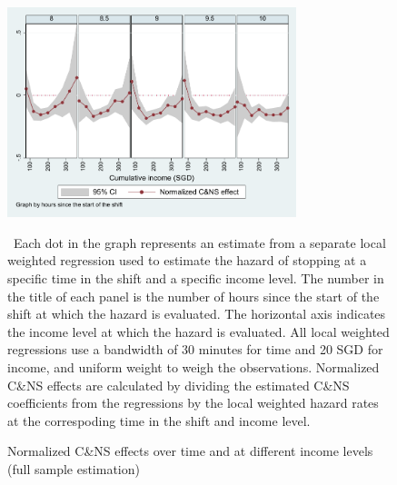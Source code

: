 \documentclass[reviewmode,AEJ]{AEA}
\begin{document}
\begin{figure}[htb]
	{\centering
		\caption{Normalized C\&NS effects over time and at different income levels (full sample estimation)} %
		\includegraphics[width=0.75\textwidth]{./fg/cnsmfxulwr80to100normalized.pdf}
		\label{fg:2dulwr}
	}
	\begin{figurenotes}
	\small\ Each dot in the graph represents an estimate from a separate local weighted regression used to estimate the hazard of stopping at a specific time in the shift and a specific income level. The number in the title of each panel is the number of hours since the start of the shift at which the hazard is evaluated. The horizontal axis indicates the income level at which the hazard is evaluated. All local weighted regressions use a bandwidth of 30 minutes for time and 20 SGD for income, and uniform weight to weigh the observations. Normalized C\&NS effects are calculated by dividing the estimated C\&NS coefficients from the regressions by the local weighted hazard rates at the correspoding time in the shift and income level. 
	\end{figurenotes}
\end{figure}

\FloatBarrier
\end{document}
